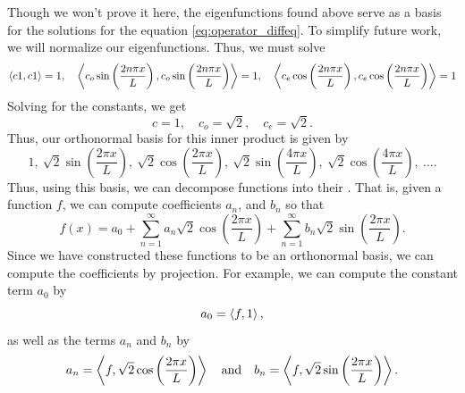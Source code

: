 Though we won't prove it here, the eigenfunctions found above serve as a basis for the solutions for the equation \ref{eq:operator_diffeq}.  To simplify future work, we will normalize our eigenfunctions. Thus, we must solve
\[
\left\langle c1, c1 \right\rangle = 1, \quad \left\langle c_o \sin\left(\frac{2n \pi x}{L}\right), c_o \sin\left(\frac{2n \pi x}{L}\right) \right\rangle=1, \quad \left\langle c_e \cos\left(\frac{2n \pi x}{L}\right), c_e \cos\left(\frac{2n \pi x}{L}\right) \right\rangle=1
\]
Solving for the constants, we get
\[
c=1, \quad c_o = \sqrt{2}, \quad c_e = \sqrt{2}.
\]
Thus, our orthonormal basis for this inner product is given by
\[
\boxed{1,~\sqrt{2}\sin\left(\frac{2 \pi x}{L}\right),~ \sqrt{2}\cos\left(\frac{2 \pi x}{L}\right), ~\sqrt{2}\sin\left(\frac{4 \pi x}{L}\right),~ \sqrt{2}\cos\left(\frac{4 \pi x}{L}\right), ~ \dots.}
\]
Thus, using this basis, we can decompose functions into their .  That is, given a function $f$, we can compute coefficients $a_n$, and $b_n$ so that
\[
f(x) = a_0 +\sum_{n=1}^\infty a_n \sqrt{2}\cos\left(\frac{2 \pi x}{L}\right)+\sum_{n=1}^\infty b_n \sqrt{2}\sin\left(\frac{2 \pi x}{L}\right).
\]
Since we have constructed these functions to be an orthonormal basis, we can compute the coefficients by projection. For example, we can compute the constant term $a_0$ by
\[
a_0 = \left\langle f, 1 \right\rangle,
\]
as well as the terms $a_n$ and $b_n$ by
\[
a_n = \left\langle f, \sqrt{2}\cos\left(\frac{2 \pi x}{L}\right) \right\rangle \quad \textrm{and} \quad b_n = \left\langle f, \sqrt{2}\sin\left(\frac{2 \pi x}{L}\right) \right\rangle.
\]

